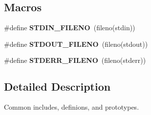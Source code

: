 \subsection*{Macros}
\begin{DoxyCompactItemize}
\item 
\mbox{\label{private_8h_afcf80a6d91178952d107ad00b165752b}} 
\#define {\bfseries S\+T\+D\+I\+N\+\_\+\+F\+I\+L\+E\+NO}~(fileno(stdin))
\item 
\mbox{\label{private_8h_abd165ee6474b5b75bf075842fff13a04}} 
\#define {\bfseries S\+T\+D\+O\+U\+T\+\_\+\+F\+I\+L\+E\+NO}~(fileno(stdout))
\item 
\mbox{\label{private_8h_ae2fe1725bb5e9823d089c46b9ed5266e}} 
\#define {\bfseries S\+T\+D\+E\+R\+R\+\_\+\+F\+I\+L\+E\+NO}~(fileno(stderr))
\end{DoxyCompactItemize}


\subsection{Detailed Description}
Common includes, definions, and prototypes. 


